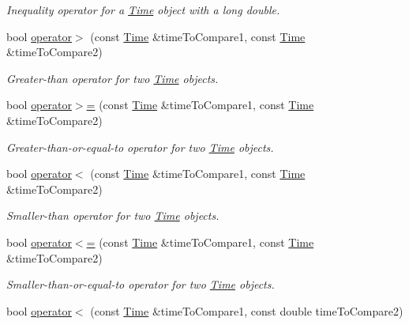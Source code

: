 \begin{DoxyCompactItemize}
\begin{DoxyCompactList}\small\item\em Inequality operator for a \hyperlink{classtudat_1_1Time}{Time} object with a long double. \end{DoxyCompactList}\item 
bool \hyperlink{classtudat_1_1Time_ac6f91d53abc7e1a2c41eb76bfef56615}{operator$>$} (const \hyperlink{classtudat_1_1Time}{Time} \&time\+To\+Compare1, const \hyperlink{classtudat_1_1Time}{Time} \&time\+To\+Compare2)
\begin{DoxyCompactList}\small\item\em Greater-\/than operator for two \hyperlink{classtudat_1_1Time}{Time} objects. \end{DoxyCompactList}\item 
bool \hyperlink{classtudat_1_1Time_a072b03ebbf66532a11eaa69d15befc5a}{operator$>$=} (const \hyperlink{classtudat_1_1Time}{Time} \&time\+To\+Compare1, const \hyperlink{classtudat_1_1Time}{Time} \&time\+To\+Compare2)
\begin{DoxyCompactList}\small\item\em Greater-\/than-\/or-\/equal-\/to operator for two \hyperlink{classtudat_1_1Time}{Time} objects. \end{DoxyCompactList}\item 
bool \hyperlink{classtudat_1_1Time_a32d6a4b8c1ea68c754eb1fcdd6624c32}{operator$<$} (const \hyperlink{classtudat_1_1Time}{Time} \&time\+To\+Compare1, const \hyperlink{classtudat_1_1Time}{Time} \&time\+To\+Compare2)
\begin{DoxyCompactList}\small\item\em Smaller-\/than operator for two \hyperlink{classtudat_1_1Time}{Time} objects. \end{DoxyCompactList}\item 
bool \hyperlink{classtudat_1_1Time_ab1a1027f41db7b2750a0abefacb209a2}{operator$<$=} (const \hyperlink{classtudat_1_1Time}{Time} \&time\+To\+Compare1, const \hyperlink{classtudat_1_1Time}{Time} \&time\+To\+Compare2)
\begin{DoxyCompactList}\small\item\em Smaller-\/than-\/or-\/equal-\/to operator for two \hyperlink{classtudat_1_1Time}{Time} objects. \end{DoxyCompactList}\item 
bool \hyperlink{classtudat_1_1Time_ac204f415f95049f2bece8edf2e539b95}{operator$<$} (const \hyperlink{classtudat_1_1Time}{Time} \&time\+To\+Compare1, const double time\+To\+Compare2)

\end{DoxyCompactItemize}

